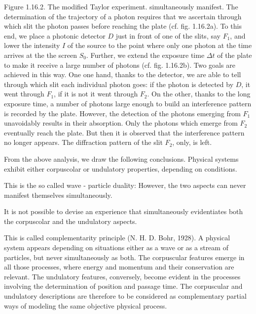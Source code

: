 \documentclass{article}
\begin{document}
Figure 1.16.2. The modified Taylor experiment.
simultaneously manifest. The determination of the trajectory of a photon requires that we ascertain through which slit the photon passes before reaching the plate (cf. fig. 1.16.2a). To this end, we place a photonic detector $D$ just in front of one of the slits, say $F_{1}$, and lower the intensity $I$ of the source to the point where only one photon at the time arrives at the the screen $S_{0}$. Further, we extend the exposure time $\Delta t$ of the plate to make it receive a large number of photons (cf. fig. 1.16.2b). Two goals are achieved in this way. One one hand, thanks to the detector, we are able to tell through which slit each individual photon goes: if the photon is detected by $D$, it went through $F_{1}$, if it is not it went through $F_{2}$. On the other, thanks to the long exposure time, a number of photons large enough to build an interference pattern is recorded by the plate. However, the detection of the photons emerging from $F_{1}$ unavoidably results in their absorption. Only the photons which emerge from $F_{2}$ eventually reach the plate. But then it is observed that the interference pattern no longer appears. The diffraction pattern of the slit $F_{2}$, only, is left.

From the above analysis, we draw the following conclusions.
Physical systems exhibit either corpuscolar or undulatory properties, depending on conditions.

This is the so called wave - particle duality: However, the two aspects can never manifest themselves simultaneously.

It is not possible to devise an experience that simultaneously evidentiates both the corpuscolar and the undulatory aspects.

This is called complementarity principle (N. H. D. Bohr, 1928). A physical system appears depending on situations either as a wave or as a stream of particles, but never simultaneously as both. The corpuscular features emerge in all those processes, where energy and momentum and their conservation are relevant. The undulatory features, conversely, become evident in the processes involving the
determination of position and passage time. The corpuscular and undulatory descriptions are therefore to be considered as complementary partial ways of modeling the same objective physical process.
\end{document}
